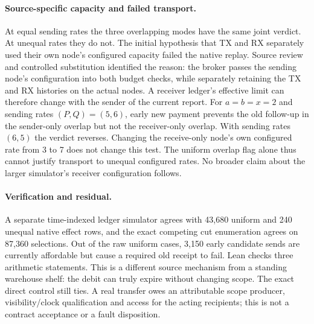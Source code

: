 \documentclass[11pt]{article}
\begin{document}
\paragraph{Source-specific capacity and failed transport.}
At equal sending rates the three overlapping modes have the same joint
verdict. At unequal rates they do not. The initial hypothesis that TX
and RX separately used their own node's configured capacity failed
the native replay. Source review and controlled substitution identified
the reason: the broker passes the sending node's configuration into
both budget checks, while separately retaining the TX and RX histories
on the actual nodes. A receiver ledger's effective limit can therefore
change with the sender of the current report.
For $a=b=x=2$ and sending rates $(P,Q)=(5,6)$, early new payment
prevents the old follow-up in the sender-only overlap but not the
receiver-only overlap. With sending rates $(6,5)$ the verdict reverses.
Changing the receive-only node's own configured rate from 3 to 7
does not change this test. The uniform overlap flag alone thus cannot
justify transport to unequal configured rates. No broader claim about
the larger simulator's receiver configuration follows.

\paragraph{Verification and residual.}
A separate time-indexed ledger simulator agrees with 43,680 uniform
and 240 unequal native effect rows, and the exact competing cut
enumeration agrees on 87,360 selections. Out of the raw uniform cases,
3,150 early candidate sends are currently affordable but cause a
required old receipt to fail. Lean checks three arithmetic statements.
This is a different source mechanism from a standing warehouse shelf:
the debit can truly expire without changing scope. The exact direct
control still ties. A real transfer owes an attributable scope producer,
visibility/clock qualification and access for the acting recipients;
this is not a contract acceptance or a fault disposition.
\end{document}

